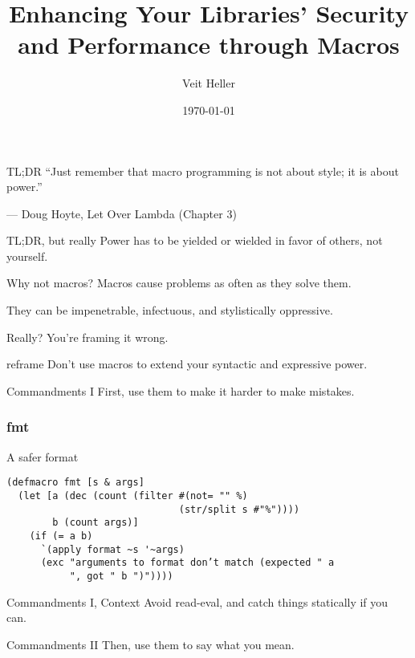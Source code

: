 \documentclass[aspectratio=169]{beamer}
\title{Enhancing Your Libraries’ Security and Performance through Macros}
\date{\today}
\author{Veit Heller}
\institute{Clojure Meetup Berlin}
\begin{document}
  \maketitle
  \begin{frame}{TL;DR}
    \Large “Just remember that macro programming is not about style; it is about
    power.”

    — Doug Hoyte, Let Over Lambda (Chapter 3)
  \end{frame}
  \begin{frame}{TL;DR, but really}
    \Large Power has to be yielded or wielded in favor of others, not yourself.
  \end{frame}
  \begin{frame}{Why not macros?}
    \Large Macros cause problems as often as they solve them.

    \Large They can be impenetrable, infectuous, and stylistically oppressive.
  \end{frame}
  \begin{frame}{Really?}
    \Large You’re framing it wrong.
  \end{frame}
  \begin{frame}{reframe}
    \Large Don’t use macros to extend your syntactic and expressive power.
  \end{frame}
  \begin{frame}{Commandments I}
    \Large First, use them to make it harder to make mistakes.
  \end{frame}
  \begin{frame}[fragile]
    \frametitle{fmt}
    \begin{listing}[H]
      \caption{A safer format}
      \begin{verbatim}
(defmacro fmt [s & args]
  (let [a (dec (count (filter #(not= "" %)
                              (str/split s #"%"))))
        b (count args)]
    (if (= a b)
      `(apply format ~s '~args)
      (exc "arguments to format don’t match (expected " a
           ", got " b ")"))))
      \end{verbatim}
    \end{listing}
  \end{frame}
  \begin{frame}{Commandments I, Context}
    \Large Avoid read-eval, and catch things statically if you can.
  \end{frame}
  \begin{frame}{Commandments II}
    \Large Then, use them to say what you mean.
  \end{frame}
\end{document}
